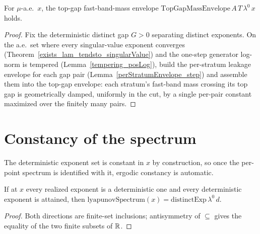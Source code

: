 \begin{theorem}\label{topGapMassEnvelope_ae}
  \leanok
  For \(\mu\)-a.e.\ \(x\), the top-gap fast-band-mass envelope
  \(\mathrm{TopGapMassEnvelope}\,A\,T\,\lambda^0\,x\) holds.
\end{theorem}
\begin{proof}\leanok
  Fix the deterministic distinct gap \(G>0\) separating distinct exponents. On the a.e.\ set where
  every singular-value exponent converges (Theorem~\ref{exists_lam_tendsto_singularValue}) and the
  one-step generator log-norm is tempered (Lemma~\ref{tempering_posLog}), build the per-stratum
  leakage envelope for each gap pair (Lemma~\ref{perStratumEnvelope_step}) and assemble them into
  the top-gap envelope: each stratum's fast-band mass crossing its top gap is geometrically
  damped, uniformly in the cut, by a single per-pair constant maximized over the finitely many
  pairs.
\end{proof}

\section{Constancy of the spectrum}

The deterministic exponent set is constant in \(x\) by construction, so once the per-point spectrum
is identified with it, ergodic constancy is automatic.

\begin{lemma}\label{lyapunovSpectrum_eq_of_subsets}
  \leanok
  If at \(x\) every realized exponent is a deterministic one and every deterministic exponent is
  attained, then \(\mathrm{lyapunovSpectrum}(x) = \mathrm{distinctExp}\,\lambda^0\,d\).
\end{lemma}
\begin{proof}\leanok
  Both directions are finite-set inclusions; antisymmetry of \(\subseteq\) gives the equality of
  the two finite subsets of \(\mathbb{R}\).
\end{proof}

